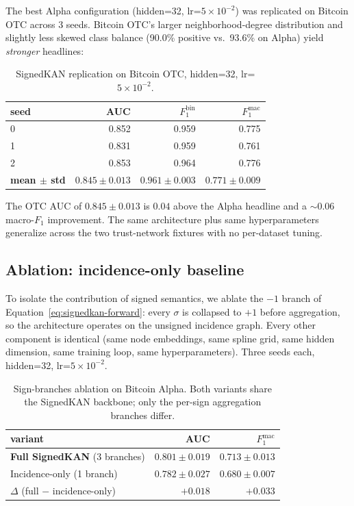 The best Alpha configuration (hidden=32, lr=$5\!\times\!10^{-2}$) was
replicated on Bitcoin OTC across 3 seeds. Bitcoin OTC's larger
neighborhood-degree distribution and slightly less skewed class
balance (90.0\% positive vs.\ 93.6\% on Alpha) yield
\emph{stronger} headlines:

\begin{table}[t]
\centering
\caption{SignedKAN replication on Bitcoin OTC, hidden=32, lr=$5\!\times\!10^{-2}$.}
\label{tab:phase3-otc}
\setlength{\tabcolsep}{4pt}
\begin{tabular}{lrrr}
\toprule
seed & AUC & $F_{1}^{\mathrm{bin}}$ & $F_{1}^{\mathrm{mac}}$ \\
\midrule
0 & 0.852 & 0.959 & 0.775 \\
1 & 0.831 & 0.959 & 0.761 \\
2 & 0.853 & 0.964 & 0.776 \\
\midrule
\textbf{mean $\pm$ std} & $\boldsymbol{0.845\pm0.013}$ & $\boldsymbol{0.961\pm0.003}$ & $\boldsymbol{0.771\pm0.009}$ \\
\bottomrule
\end{tabular}
\end{table}

The OTC AUC of $0.845 \pm 0.013$ is $0.04$ above the Alpha headline
and a $\sim 0.06$ macro-$F_1$ improvement. The same architecture
plus same hyperparameters generalize across the two trust-network
fixtures with no per-dataset tuning.

\subsection{Ablation: incidence-only baseline}

To isolate the contribution of signed semantics, we ablate the
$-1$ branch of Equation~\eqref{eq:signedkan-forward}: every $\sigma$
is collapsed to $+1$ before aggregation, so the architecture
operates on the unsigned incidence graph. Every other component is
identical (same node embeddings, same spline grid, same hidden
dimension, same training loop, same hyperparameters). Three seeds
each, hidden=32, lr=$5\!\times\!10^{-2}$.

\begin{table}[t]
\centering
\caption{Sign-branches ablation on Bitcoin Alpha. Both variants
share the SignedKAN backbone; only the per-sign aggregation branches
differ.}
\label{tab:ablation}
\setlength{\tabcolsep}{4pt}
\begin{tabular}{lrr}
\toprule
variant & AUC & $F_{1}^{\mathrm{mac}}$ \\
\midrule
\textbf{Full SignedKAN} (3 branches) & $\boldsymbol{0.801\pm0.019}$ & $\boldsymbol{0.713\pm0.013}$ \\
Incidence-only (1 branch)            & $0.782\pm0.027$ & $0.680\pm0.007$ \\
\midrule
$\Delta$ (full $-$ incidence-only)   & $\boldsymbol{+0.018}$         & $\boldsymbol{+0.033}$ \\
\bottomrule
\end{tabular}
\end{table}

